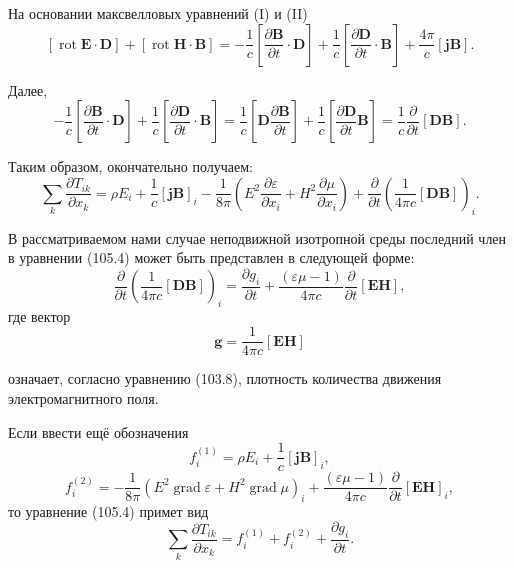 \documentclass[a4paper,10pt]{article}
\begin{document}
На основании максвелловых уравнений (I) и (II)
$$
    [\operatorname{rot}\mathbf{E}\cdot\mathbf{D}]
    + [\operatorname{rot}\mathbf{H}\cdot\mathbf{B}]
    = -\frac{1}{c}\!\left[\frac{\partial\mathbf{B}}{\partial t}\cdot\mathbf{D}\right]
    + \frac{1}{c}\!\left[\frac{\partial\mathbf{D}}{\partial t}\cdot\mathbf{B}\right]
    + \frac{4\pi}{c}[\mathbf{j}\mathbf{B}].
$$

Далее,
$$
    -\frac{1}{c}\!\left[\frac{\partial\mathbf{B}}{\partial t}\cdot\mathbf{D}\right]
    + \frac{1}{c}\!\left[\frac{\partial\mathbf{D}}{\partial t}\cdot\mathbf{B}\right]
    = \frac{1}{c}\!\left[\mathbf{D}\frac{\partial\mathbf{B}}{\partial t}\right]
    + \frac{1}{c}\!\left[\frac{\partial\mathbf{D}}{\partial t}\mathbf{B}\right]
    = \frac{1}{c}\frac{\partial}{\partial t}[\mathbf{D}\mathbf{B}].
$$

Таким образом, окончательно получаем:
\begin{equation}
    \sum_k\frac{\partial T_{ik}}{\partial x_k}
    = \rho E_i + \frac{1}{c}[\mathbf{j}\mathbf{B}]_i
    - \frac{1}{8\pi}\!\left(
        E^2\frac{\partial\varepsilon}{\partial x_i}
      + H^2\frac{\partial\mu}{\partial x_i}
    \right)
    + \frac{\partial}{\partial t}\!\left(\frac{1}{4\pi c}[\mathbf{D}\mathbf{B}]\right)_i.
    \tag{105.4}
\end{equation}

В рассматриваемом нами случае неподвижной изотропной среды последний
член в уравнении (105.4) может быть представлен в следующей форме:
$$
    \frac{\partial}{\partial t}\!\left(\frac{1}{4\pi c}[\mathbf{D}\mathbf{B}]\right)_i
    = \frac{\partial g_i}{\partial t}
    + \frac{(\varepsilon\mu - 1)}{4\pi c}\frac{\partial}{\partial t}[\mathbf{E}\mathbf{H}],
$$
где вектор
$$
    \mathbf{g} = \frac{1}{4\pi c}[\mathbf{E}\mathbf{H}]
$$


означает, согласно уравнению (103.8), плотность количества движения
электромагнитного поля.

Если ввести ещё обозначения
\begin{equation}
    f_i^{(1)} = \rho E_i + \frac{1}{c}[\mathbf{j}\mathbf{B}]_i,
    \tag{105.5}
\end{equation}
\begin{equation}
    f_i^{(2)} = -\frac{1}{8\pi}\!\left(
        E^2\operatorname{grad}\varepsilon + H^2\operatorname{grad}\mu
    \right)_i
    + \frac{(\varepsilon\mu - 1)}{4\pi c}\frac{\partial}{\partial t}[\mathbf{E}\mathbf{H}]_i,
    \tag{105.6}
\end{equation}
то уравнение (105.4) примет вид
\begin{equation}
    \sum_k\frac{\partial T_{ik}}{\partial x_k}
    = f_i^{(1)} + f_i^{(2)} + \frac{\partial g_i}{\partial t}.
    \tag{105.7}
\end{equation}
\end{document}
